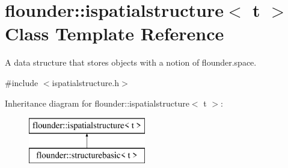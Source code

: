 \hypertarget{classflounder_1_1ispatialstructure}{}\section{flounder\+:\+:ispatialstructure$<$ t $>$ Class Template Reference}
\label{classflounder_1_1ispatialstructure}


A data structure that stores objects with a notion of flounder.\+space.  




{\ttfamily \#include $<$ispatialstructure.\+h$>$}

Inheritance diagram for flounder\+:\+:ispatialstructure$<$ t $>$\+:\begin{figure}[H]
\begin{center}
\leavevmode
\includegraphics[height=2.000000cm]{classflounder_1_1ispatialstructure}
\end{center}
\end{figure}

